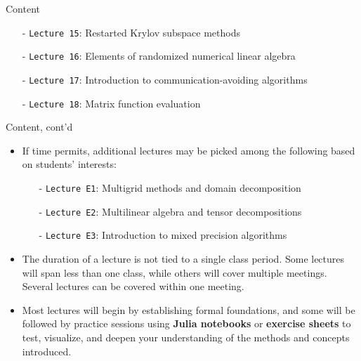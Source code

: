 \documentclass[t,usepdftitle=false]{beamer}
\begin{document}
\begin{frame}{Content}
\begin{itemize}
\begin{itemize}
\item[-] \texttt{Lecture 15}: Restarted Krylov subspace methods\vspace{.02cm}
\item[-] \texttt{Lecture 16}: Elements of randomized numerical linear algebra\vspace{.02cm}
\item[-] \texttt{Lecture 17}: Introduction to communication-avoiding algorithms\vspace{.02cm}
\item[-] \texttt{Lecture 18}: Matrix function evaluation
\end{itemize}
\end{itemize}
\end{frame}

\begin{frame}{Content, cont'd}
\begin{itemize}
\item If time permits, additional lectures may be picked among the following based on students' interests:
\begin{itemize}
\item[-] \texttt{Lecture E1}: Multigrid methods and domain decomposition\vspace{.04cm}
\item[-] \texttt{Lecture E2}: Multilinear algebra and tensor decompositions\vspace{.04cm}
\item[-] \texttt{Lecture E3}: Introduction to mixed precision algorithms
\end{itemize}
\item The duration of a lecture is not tied to a single class period.
Some lectures will span less than one class, while others will cover multiple meetings.
Several lectures can be covered within one meeting.
\item Most lectures will begin by establishing formal foundations, and some will be followed by practice sessions using \textbf{Julia notebooks} or \textbf{exercise sheets} to test, visualize, and deepen your understanding of the methods and concepts introduced.
\end{itemize}
\end{frame}
\end{document}
